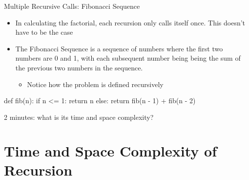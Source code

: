 \documentclass[
  ignorenonframetext,
]{beamer}
\newenvironment{Shaded}{\begin{snugshade}}{\end{snugshade}}
\newcommand{\ControlFlowTok}[1]{\textcolor[rgb]{0.00,0.23,0.31}{#1}}
\newcommand{\DecValTok}[1]{\textcolor[rgb]{0.68,0.00,0.00}{#1}}
\newcommand{\KeywordTok}[1]{\textcolor[rgb]{0.00,0.23,0.31}{#1}}
\newcommand{\NormalTok}[1]{\textcolor[rgb]{0.00,0.23,0.31}{#1}}
\newcommand{\OperatorTok}[1]{\textcolor[rgb]{0.37,0.37,0.37}{#1}}
\providecommand{\tightlist}{%
  \setlength{\itemsep}{0pt}\setlength{\parskip}{0pt}}\usepackage{longtable,booktabs,array}
\begin{document}
\begin{frame}[fragile]{Multiple Recursive Calls: Fibonacci Sequence}
\protect\hypertarget{multiple-recursive-calls-fibonacci-sequence}{}
\begin{itemize}
\item
  In calculating the factorial, each recursion only calls itself once.
  This doesn't have to be the case
\item
  The Fibonacci Sequence is a sequence of numbers where the first two
  numbers are 0 and 1, with each subsequent number being being the sum
  of the previous two numbers in the sequence.

  \begin{itemize}
  \tightlist
  \item
    Notice how the problem is defined recursively
  \end{itemize}
\end{itemize}

\begin{Shaded}
\begin{Highlighting}[]
\KeywordTok{def}\NormalTok{ fib(n):}
  \ControlFlowTok{if}\NormalTok{ n }\OperatorTok{\textless{}=} \DecValTok{1}\NormalTok{:}
    \ControlFlowTok{return}\NormalTok{ n}
  \ControlFlowTok{else}\NormalTok{:}
    \ControlFlowTok{return}\NormalTok{ fib(n }\OperatorTok{{-}} \DecValTok{1}\NormalTok{) }\OperatorTok{+}\NormalTok{ fib(n }\OperatorTok{{-}} \DecValTok{2}\NormalTok{)}
\end{Highlighting}
\end{Shaded}

2 minutes: what is its time and space complexity?
\end{frame}

\hypertarget{time-and-space-complexity-of-recursion}{%
\section{Time and Space Complexity of
Recursion}\label{time-and-space-complexity-of-recursion}}
\end{document}
